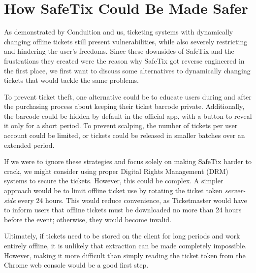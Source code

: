 \section{How SafeTix Could Be Made Safer}
As demonstrated by Conduition and us, ticketing systems with dynamically changing offline tickets still present vulnerabilities, while also severely restricting and hindering the user's freedoms. Since these downsides of SafeTix and the frustrations they created were the reason why SafeTix got reverse engineered in the first place, we first want to discuss some alternatives to dynamically changing tickets that would tackle the same problems.

To prevent ticket theft, one alternative could be to educate users during and after the purchasing process 
about keeping their ticket barcode private. Additionally, the barcode could be hidden by default 
in the official app, with a button to reveal it only for a short period. To prevent scalping, 
the number of tickets per user account could be limited, or tickets could be released in smaller 
batches over an extended period.

If we were to ignore these strategies and focus solely on making SafeTix harder to crack, we might
consider using proper Digital Rights Management (DRM) systems to secure the tickets. However, 
this could be complex. A simpler approach would be to limit offline ticket use by rotating the 
ticket token \textit{server-side} every 24 hours. This would reduce convenience, as Ticketmaster 
would have to inform users that offline tickets must be downloaded no more than 24 hours before 
the event; otherwise, they would become invalid.

Ultimately, if tickets need to be stored on the client for long periods and work entirely offline, 
it is unlikely that extraction can be made completely impossible. However, making it more difficult 
than simply reading the ticket token from the Chrome web console would be a good first step.
